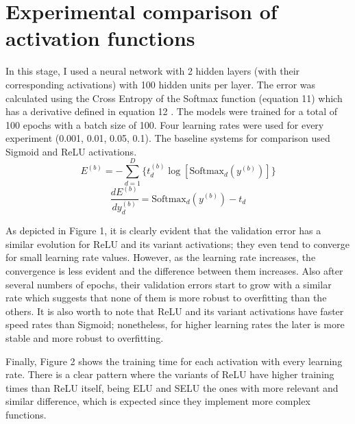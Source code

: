 \documentclass{article}
\begin{document}
\section{Experimental comparison of activation functions}
\label{sec:actexpts}
In this stage, I used a neural network with 2 hidden layers (with their corresponding activations) with 100 hidden units per layer. The error was calculated using the Cross Entropy of the Softmax function (equation 11) which has a derivative defined in equation 12 . The models were trained for a total of 100 epochs with a batch size of 100. Four learning rates were used for every experiment (0.001, 0.01, 0.05, 0.1). The baseline systems for comparison used Sigmoid and ReLU activations.
\begin{equation}
	E^{(b)} = -\sum_{d=1}^D \lbrace t^{(b)}_d \log\left[\textrm{Softmax}_d\left({y}^{(b)}\right)\right]\rbrace
\end{equation}
\begin{equation}
     \frac{dE^{(b)}}{dy^{(b)}_d} = \textrm{Softmax}_d \left({y}^{(b)}\right) - t_d
\end{equation}


As depicted in Figure 1, it is clearly evident that the validation error has a similar evolution for ReLU and its variant activations; they even tend to converge for small learning rate values. However, as the learning rate increases, the convergence is less evident and the difference between them increases. Also after several numbers of epochs, their validation errors start to grow with a similar rate which suggests that none of them is more robust to overfitting than the others. It is also worth to note that ReLU and its variant activations have faster speed rates than Sigmoid; nonetheless, for higher learning rates the later is more stable and more robust to overfitting.

Finally,  Figure 2 shows the training time for each activation with every learning rate. There is a clear pattern where the variants of ReLU have higher training times than ReLU itself, being ELU and SELU the ones with more relevant and similar difference, which is expected since they implement more complex functions.
\end{document}
